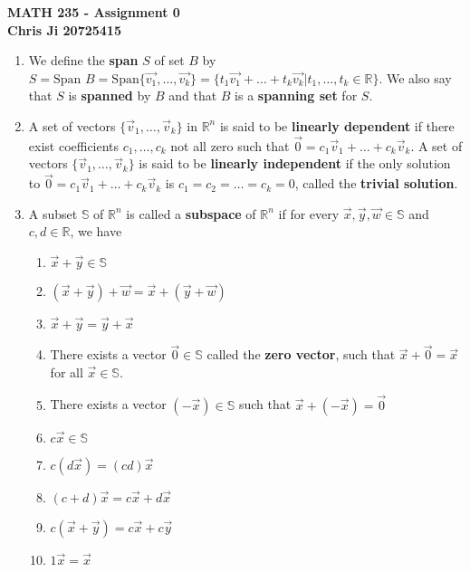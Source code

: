 \documentclass[10pt,english]{article}
\begin{document}
\noindent \begin{center}
\textbf{\large{}MATH 235 - Assignment 0}\\
\textbf{\large{}Chris Ji 20725415}
\par\end{center}{\large \par}
\medskip{}

\begin{enumerate}
\item We define the \textbf{span} $S$ of set $B$ by $S=\text{Span }B=\text{Span}\{\vec{v_1},\ldots,\vec{v_k}\}=\{t_1\vec{v_1}+\ldots+t_k\vec{v_k} | t_1,\ldots,t_k\in\mathbb{R}\}$. We also say that $S$ is \textbf{spanned} by $B$ and that $B$ is a \textbf{spanning set} for $S$. \pagebreak
\item A set of vectors $\{\vec{v}_1,\ldots,\vec{v}_k\}$ in $\mathbb{R}^n$ is said to be \textbf{linearly dependent} if there exist coefficients $c_1,\ldots,c_k$ not all zero such that $\vec{0}=c_1\vec{v}_1+\ldots+c_k\vec{v}_k$. A set of vectors $\{\vec{v}_1,\ldots,\vec{v}_k\}$ is said to be \textbf{linearly independent} if the only solution to $\vec{0}=c_1\vec{v}_1+\ldots+c_k\vec{v}_k$ is $c_1=c_2=\ldots=c_k=0$, called the \textbf{trivial solution}.\pagebreak
\item A subset $\mathbb{S}$ of $\mathbb{R}^n$ is called a \textbf{subspace} of $\mathbb{R}^n$ if for every $\vec{x},\vec{y},\vec{w}\in\mathbb{S}$ and $c,d\in\mathbb{R}$, we have \begin{enumerate}
    \item $\vec{x}+\vec{y}\in\mathbb{S}$ 
    \item $(\vec{x}+\vec{y})+\vec{w}=\vec{x}+(\vec{y}+\vec{w})$ 
    \item $\vec{x}+\vec{y}=\vec{y}+\vec{x}$ 
    \item There exists a vector $\vec{0}\in\mathbb{S}$ called the \textbf{zero vector}, such that $\vec{x}+\vec{0}=\vec{x}$ for all $\vec{x}\in\mathbb{S}$. 
    \item There exists a vector $(-\vec{x})\in\mathbb{S}$ such that $\vec{x}+(-\vec{x})=\vec{0}$ 
    \item $c\vec{x}\in\mathbb{S}$ 
    \item $c(d\vec{x})=(cd)\vec{x}$ 
    \item $(c+d)\vec{x}=c\vec{x}+d\vec{x}$ 
    \item $c(\vec{x}+\vec{y})=c\vec{x}+c\vec{y}$
    \item $1\vec{x}=\vec{x}$
\end{enumerate} \pagebreak

\end{enumerate}
\end{document}
